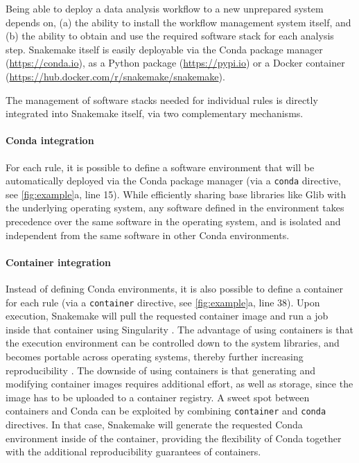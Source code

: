 \documentclass[parskip=half]{scrartcl}
\let\plainurl\url
\renewcommand{\url}[1]{\protect\plainurl{#1}}
\begin{document}
Being able to deploy a data analysis workflow to a new unprepared system depends on, (a) the ability to install the workflow management system itself, and (b) the ability to obtain and use the required software stack for each analysis step.
Snakemake itself is easily deployable via the Conda package manager (\url{https://conda.io}), as a Python package (\url{https://pypi.io}) or a Docker container (\url{https://hub.docker.com/r/snakemake/snakemake}).

The management of software stacks needed for individual rules is directly integrated into Snakemake itself, via two complementary mechanisms.

\paragraph{Conda integration}

For each rule, it is possible to define a software environment that will be automatically deployed via the Conda package manager (via a \lstinline!conda! directive, see \autoref{fig:example}a, line 15).
While efficiently sharing base libraries like Glib with the underlying operating system, any software defined in the environment takes precedence over the same software in the operating system, and is isolated and independent from the same software in other Conda environments.

\paragraph{Container integration}

Instead of defining Conda environments, it is also possible to define a container for each rule (via a \lstinline!container! directive, see \autoref{fig:example}a, line 38).
Upon execution, Snakemake will pull the requested container image and run a job inside that container using Singularity \parencite{kurtzer_singularity_2017}.
The advantage of using containers is that the execution environment can be controlled down to the system libraries, and becomes portable across operating systems, thereby further increasing reproducibility \parencite{gruning_practical_2018}.
The downside of using containers is that generating and modifying container images requires additional effort, as well as storage, since the image has to be uploaded to a container registry.
A sweet spot between containers and Conda can be exploited by combining \lstinline!container! and \lstinline!conda! directives.
In that case, Snakemake will generate the requested Conda environment inside of the container, providing the flexibility of Conda together with the additional reproducibility guarantees of containers.
\end{document}
